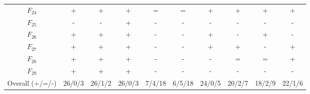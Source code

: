 \begin{center}
\begin{longtable}{cccccccccc}
$F_{24}$ & + & + & + & = & = & + & + & + & + \\
$F_{25}$ & - & - & + & - & - & - & - & - & - \\
$F_{26}$ & + & + & + & - & - & + & - & + & - \\
$F_{27}$ & + & + & + & - & - & + & + & - & + \\
$F_{28}$ & + & + & + & - & - & - & = & = & + \\
$F_{29}$ & + & + & + & - & - & - & - & - & - \\
\midrule
Overall (+/=/-) & 26/0/3 & 26/1/2 & 26/0/3 & 7/4/18 & 6/5/18 & 24/0/5 & 20/2/7 & 18/2/9 & 22/1/6 \\
\bottomrule
\end{longtable}
\end{center}